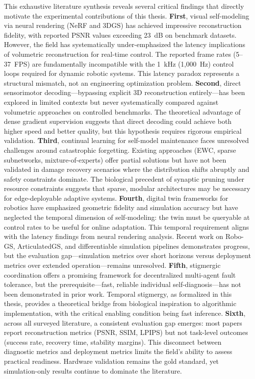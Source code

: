 \documentclass[12pt,a4paper,oneside]{report}
\begin{document}
This exhaustive literature synthesis reveals several critical findings that directly motivate the experimental contributions of this thesis.
\textbf{First}, visual self-modeling via neural rendering (NeRF and 3DGS) has achieved impressive reconstruction fidelity, with reported PSNR values exceeding 23~dB on benchmark datasets. However, the field has systematically under-emphasized the latency implications of volumetric reconstruction for real-time control. The reported frame rates (5--37~FPS) are fundamentally incompatible with the 1~kHz (1,000~Hz) control loops required for dynamic robotic systems. This latency paradox represents a structural mismatch, not an engineering optimization problem.
\textbf{Second}, direct sensorimotor decoding---bypassing explicit 3D reconstruction entirely---has been explored in limited contexts but never systematically compared against volumetric approaches on controlled benchmarks. The theoretical advantage of dense gradient supervision suggests that direct decoding could achieve both higher speed and better quality, but this hypothesis requires rigorous empirical validation.
\textbf{Third}, continual learning for self-model maintenance faces unresolved challenges around catastrophic forgetting. Existing approaches (EWC, sparse subnetworks, mixture-of-experts) offer partial solutions but have not been validated in damage recovery scenarios where the distribution shifts abruptly and safety constraints dominate. The biological precedent of synaptic pruning under resource constraints suggests that sparse, modular architectures may be necessary for edge-deployable adaptive systems.
\textbf{Fourth}, digital twin frameworks for robotics have emphasized geometric fidelity and simulation accuracy but have neglected the temporal dimension of self-modeling: the twin must be queryable at control rates to be useful for online adaptation. This temporal requirement aligns with the latency findings from neural rendering analysis. Recent work on Robo-GS, ArticulatedGS, and differentiable simulation pipelines demonstrates progress, but the evaluation gap---simulation metrics over short horizons versus deployment metrics over extended operation---remains unresolved.
\textbf{Fifth}, stigmergic coordination offers a promising framework for decentralized multi-agent fault tolerance, but the prerequisite---fast, reliable individual self-diagnosis---has not been demonstrated in prior work. Temporal stigmergy, as formalized in this thesis, provides a theoretical bridge from biological inspiration to algorithmic implementation, with the critical enabling condition being fast inference.
\textbf{Sixth}, across all surveyed literature, a consistent evaluation gap emerges: most papers report reconstruction metrics (PSNR, SSIM, LPIPS) but not task-level outcomes (success rate, recovery time, stability margins). This disconnect between diagnostic metrics and deployment metrics limits the field's ability to assess practical readiness. Hardware validation remains the gold standard, yet simulation-only results continue to dominate the literature.
\end{document}
